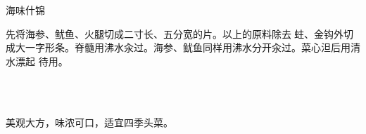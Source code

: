 \begin{recipe}{海味什锦}

\ingredients


\preparation

\step 先将海参、鱿鱼、火腿切成二寸长、五分宽的片。以上的原料除去𧎼蛀、金钩外切
成大一字形条。脊髓用沸水汆过。海参、鱿鱼同样用沸水分开汆过。菜心泹后用清水漂起
待用。

\step 𧎼蛀放在蒸碗内上笼大火蒸𤆵，将锅放在旺火上，放下猪油，再放入姜葱，爆出香
味后，倒入鸡汤、盐、糖汁、料酒、酱油、花椒、胡椒及以上用沸水汆过的原材料（除鱿
鱼、海参、脊髓、小菜外）小火烧𤆵。再将小菜泹𤆵后，在白油锅内煸过，起锅垫入走菜
盘内。再将烧𤆵后的一字条，捞入盘内放在小菜上边。鱿鱼、脊髓，放在烧一字条等原料
的原汁内，烧上味打入盘内放在一字条块上边。再放入海参于原汁内烧上味，勾入豆粉，
起锅淋入盘内，海参放在鱿鱼、脊髓上面上席。

\features

美观大方，味浓可口，适宜四季头菜。

\end{recipe}


